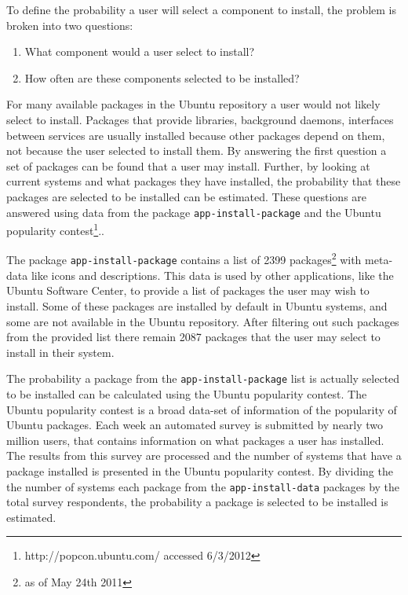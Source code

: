 To define the probability a user will select a component to install, the problem is broken into two questions:
\begin{enumerate}
  \item What component would a user select to install?
  \item How often are these components selected to be installed?
\end{enumerate}
For many available packages in the Ubuntu repository a user would not likely select to install.
Packages that provide libraries, background daemons, interfaces between services are usually installed because other packages depend on them, not because the user selected to install them.
By answering the first question a set of packages can be found that a user may install.
Further, by looking at current systems and what packages they have installed, the probability that these packages are selected to be installed can be estimated.
These questions are answered using data from the package \texttt{app-install-package} and the Ubuntu popularity contest\footnote{http://popcon.ubuntu.com/ accessed 6/3/2012}..

The package \texttt{app-install-package} contains a list of 2399 packages\footnote{as of May 24th 2011} with meta-data like icons and descriptions.
This data is used by other applications, like the Ubuntu Software Center, to provide a list of packages the user may wish to install.
Some of these packages are installed by default in Ubuntu systems, and some are not available in the Ubuntu repository.
After filtering out such packages from the provided list there remain 2087 packages that the user may select to install in their system. 

The probability a package from the \texttt{app-install-package} list is actually selected to be installed can be calculated using the Ubuntu popularity contest.
The Ubuntu popularity contest is a broad data-set of information of the popularity of Ubuntu packages.
Each week an automated survey is submitted by nearly two million users, that contains information on what packages a user has installed.
The results from this survey are processed and the number of systems that have a package installed is presented in the Ubuntu popularity contest.
By dividing the the number of systems each package from the \texttt{app-install-data} packages  by the total survey respondents, 
the probability a package is selected to be installed is estimated.

